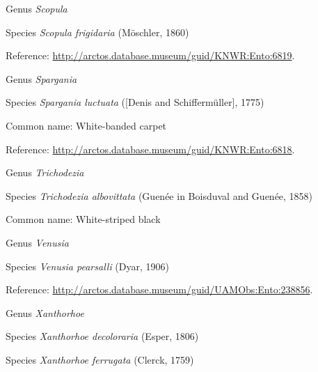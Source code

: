 \documentclass[9pt, article]{memoir}
\begin{document}
\begin{multicols}{2}
\vspace{6pt}\noindent\hspace{30pt}Genus \textit{Scopula}


\vspace{6pt}\noindent\hspace{36pt}Species \textit{Scopula frigidaria} (Möschler, 1860)


Reference: 
\url{http://arctos.database.museum/guid/KNWR:Ento:6819}.

\vspace{6pt}\noindent\hspace{30pt}Genus \textit{Spargania}


\vspace{6pt}\noindent\hspace{36pt}Species \textit{Spargania luctuata} ([Denis and Schiffermüller], 1775)


Common name: White-banded carpet

Reference: 
\url{http://arctos.database.museum/guid/KNWR:Ento:6818}.

\vspace{6pt}\noindent\hspace{30pt}Genus \textit{Trichodezia}


\vspace{6pt}\noindent\hspace{36pt}Species \textit{Trichodezia albovittata} (Guenée in Boisduval and Guenée, 1858)


Common name: White-striped black

\vspace{6pt}\noindent\hspace{30pt}Genus \textit{Venusia}


\vspace{6pt}\noindent\hspace{36pt}Species \textit{Venusia pearsalli} (Dyar, 1906)


Reference: 
\url{http://arctos.database.museum/guid/UAMObs:Ento:238856}.

\vspace{6pt}\noindent\hspace{30pt}Genus \textit{Xanthorhoe}


\vspace{6pt}\noindent\hspace{36pt}Species \textit{Xanthorhoe decoloraria} (Esper, 1806)


\vspace{6pt}\noindent\hspace{36pt}Species \textit{Xanthorhoe ferrugata} (Clerck, 1759)



\end{multicols}
\end{document}

